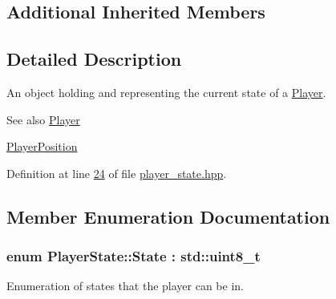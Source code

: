\subsection*{Additional Inherited Members}


\subsection{Detailed Description}
An object holding and representing the current state of a \hyperlink{classPlayer}{Player}. 

\begin{DoxySeeAlso}{See also}
\hyperlink{classPlayer}{Player} 

\hyperlink{classPlayerPosition}{Player\+Position} 
\end{DoxySeeAlso}


Definition at line \hyperlink{player__state_8hpp_source_l00024}{24} of file \hyperlink{player__state_8hpp_source}{player\+\_\+state.\+hpp}.



\subsection{Member Enumeration Documentation}
\hypertarget{classPlayerState_ab013f68ff23d69d677faae624b5dff07}{
\subsubsection[{State}]{\setlength{\rightskip}{0pt plus 5cm}enum {\bf Player\+State\+::\+State} \+: std\+::uint8\+\_\+t\hspace{0.3cm}{\ttfamily [strong]}}}\label{classPlayerState_ab013f68ff23d69d677faae624b5dff07}


Enumeration of states that the player can be in. 

